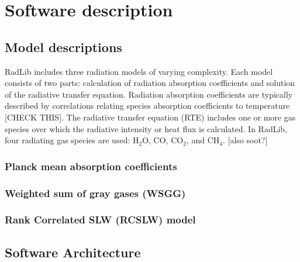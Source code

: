 \documentclass[preprint,12pt, a4paper]{elsarticle}
\begin{document}
\section{Software description}
\label{s:description}


\subsection{Model descriptions}
\label{s:models}

RadLib includes three radiation models of varying complexity. Each model consists of two parts: calculation of radiation absorption coefficients and solution of the radiative transfer equation. Radiation absorption coefficients are typically described by correlations relating species absorption coefficients to temperature [CHECK THIS]. The radiative transfer equation (RTE) includes one or more gas species over which the radiative intensity or heat flux is calculated. In RadLib, four radiating gas species are used: H$_2$O, CO, CO$_2$, and CH$_4$. [also soot?] 

\subsubsection{Planck mean absorption coefficients}
\label{s:planckmean}


\subsubsection{Weighted sum of gray gases (WSGG)}
\label{s:wsgg}

\subsubsection{Rank Correlated SLW (RCSLW) model}
\label{s:RCSLW}

\subsection{Software Architecture}
\label{s:architechture}
\end{document}
